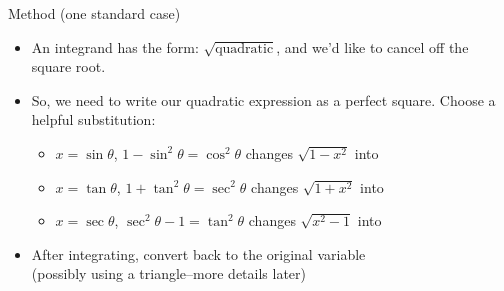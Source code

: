 \begin{frame}{Method (one standard case)}
\begin{itemize}[<+->]
\item An integrand has the form: \textcolor{W1}{$\sqrt{\text{quadratic}}$}, and we'd like to cancel off the square root.
\vfill
\item So, we need to write our quadratic expression as a perfect square. Choose a helpful substitution:
\vfill
\begin{itemize}
\item \textcolor{M3}{$x=\sin\theta$}, $1-\sin^2\theta=\cos^2 \theta$ changes \textcolor{W1}{$\sqrt{1-x^2}$} into 
\vfill
\item \textcolor{M3}{$x=\tan\theta$}, $1+\tan^2\theta=\sec^2 \theta$ changes \textcolor{W1}{$\sqrt{1+x^2}$} into  
\vfill
\item \textcolor{M3}{$x=\sec\theta$}, $\sec^2\theta-1=\tan^2 \theta$ changes \textcolor{W1}{$\sqrt{x^2-1}$} into 
\end{itemize}
\vfill
\item After integrating, convert back to the original variable\\ (possibly using a triangle--more details later)
\end{itemize}
\end{frame}

